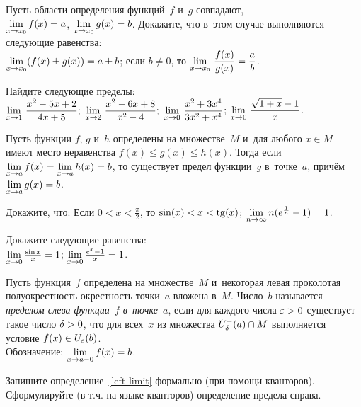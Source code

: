 \documentclass[a4paper,12pt]{article}
\begin{document}
%

Пусть области определения функций~$f$ и~$g$ совпадают, \\
$\lim\limits_{x \rightarrow x_0} f(x)=a$, $\lim\limits_{x \rightarrow x_0} g(x)=b$. Докажите, что в~этом случае выполняются следующие равенства:\\
{
$\lim\limits_{x \rightarrow x_0}(f(x)\pm g(x))=a\pm b$;}
{
если $b\ne0$, то $\lim\limits_{x \rightarrow x_0}\,\dfrac{f(x)}{g(x)}=\dfrac{a}{b}$.}

Найдите следующие пределы:\\
$\lim\limits_{x \rightarrow 1}\,\dfrac{x^2-5x+2}{4x+5};$
$\lim\limits_{x \rightarrow 2}\,\dfrac{x^2-6x+8}{x^2-4};$
$\lim\limits_{x \rightarrow 0}\,\dfrac{x^2+3x^4}{3x^2+x^4}$;
$\lim\limits_{x \rightarrow 0}\,\dfrac{\sqrt{1+x}-1}{x}$.

Пусть функции $f$, $g$ и~$h$ определены на множестве~$M$ и~для любого $x\in M$ имеют место неравенства $f(x) \le g(x) \le h(x)$. Тогда если $\lim\limits_{x \rightarrow a}f(x) = \lim\limits_{x \rightarrow a}h(x) = b$, то существует предел функции~$g$ в~точке~$a$, причём $\lim\limits_{x \rightarrow a}g(x) = b$.

Докажите, что:
Если $0 < x < \frac{\pi}2$, то $\sin(x) < x < \tg(x)$;
$\lim\limits_{n \rightarrow \infty} n(e^{\frac1n}-1)=1$.

Докажите следующие равенства:\\
$\lim\limits_{x \rightarrow 0} \frac{\sin x}{x}=1$;
$\lim\limits_{x \rightarrow 0} \frac{e^x-1}{x}=1$.

\newpage

\label{left limit}
Пусть функция~$f$ определена на множестве~$M$
и~некоторая левая проколотая полуокрестность окрестность точки~$a$ вложена в~$M$.
Число~$b$ называется \emph{пределом слева функции~$f$ в~точке~$a$}, если для каждого числа $\varepsilon > 0$ существует такое число $\delta > 0$, что для всех~$x$ из множества $\dot U_\delta^-(a)\cap M$ выполняется условие $f(x)\in U_\varepsilon(b)$.\\
Обозначение: $\lim\limits_{x \rightarrow a-0} f(x)=b$.

Запишите определение~\ref{left limit} формально (при помощи кванторов).\\
Сформулируйте (в т.ч. на языке кванторов) определение предела справа.
\end{document}
